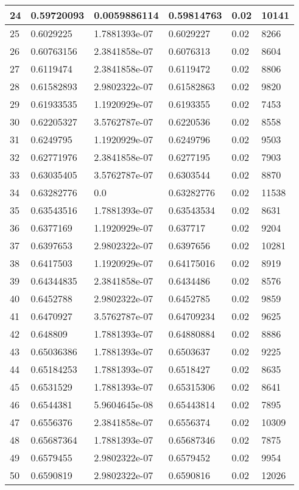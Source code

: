 \begin{longtable}{|l|l|l|l|l|l|}
24 & 0.59720093 & 0.0059886114 & 0.59814763 & 0.02 & 10141 \\ \hline 
25 & 0.6029225 & 1.7881393e-07 & 0.6029227 & 0.02 & 8266 \\ \hline 
26 & 0.60763156 & 2.3841858e-07 & 0.6076313 & 0.02 & 8604 \\ \hline 
27 & 0.6119474 & 2.3841858e-07 & 0.6119472 & 0.02 & 8806 \\ \hline 
28 & 0.61582893 & 2.9802322e-07 & 0.61582863 & 0.02 & 9820 \\ \hline 
29 & 0.61933535 & 1.1920929e-07 & 0.6193355 & 0.02 & 7453 \\ \hline 
30 & 0.62205327 & 3.5762787e-07 & 0.6220536 & 0.02 & 8558 \\ \hline 
31 & 0.6249795 & 1.1920929e-07 & 0.6249796 & 0.02 & 9503 \\ \hline 
32 & 0.62771976 & 2.3841858e-07 & 0.6277195 & 0.02 & 7903 \\ \hline 
33 & 0.63035405 & 3.5762787e-07 & 0.6303544 & 0.02 & 8870 \\ \hline 
34 & 0.63282776 & 0.0 & 0.63282776 & 0.02 & 11538 \\ \hline 
35 & 0.63543516 & 1.7881393e-07 & 0.63543534 & 0.02 & 8631 \\ \hline 
36 & 0.6377169 & 1.1920929e-07 & 0.637717 & 0.02 & 9204 \\ \hline 
37 & 0.6397653 & 2.9802322e-07 & 0.6397656 & 0.02 & 10281 \\ \hline 
38 & 0.6417503 & 1.1920929e-07 & 0.64175016 & 0.02 & 8919 \\ \hline 
39 & 0.64344835 & 2.3841858e-07 & 0.6434486 & 0.02 & 8576 \\ \hline 
40 & 0.6452788 & 2.9802322e-07 & 0.6452785 & 0.02 & 9859 \\ \hline 
41 & 0.6470927 & 3.5762787e-07 & 0.64709234 & 0.02 & 9625 \\ \hline 
42 & 0.648809 & 1.7881393e-07 & 0.64880884 & 0.02 & 8886 \\ \hline 
43 & 0.65036386 & 1.7881393e-07 & 0.6503637 & 0.02 & 9225 \\ \hline 
44 & 0.65184253 & 1.7881393e-07 & 0.6518427 & 0.02 & 8635 \\ \hline 
45 & 0.6531529 & 1.7881393e-07 & 0.65315306 & 0.02 & 8641 \\ \hline 
46 & 0.6544381 & 5.9604645e-08 & 0.65443814 & 0.02 & 7895 \\ \hline 
47 & 0.6556376 & 2.3841858e-07 & 0.6556374 & 0.02 & 10309 \\ \hline 
48 & 0.65687364 & 1.7881393e-07 & 0.65687346 & 0.02 & 7875 \\ \hline 
49 & 0.6579455 & 2.9802322e-07 & 0.6579452 & 0.02 & 9954 \\ \hline 
50 & 0.6590819 & 2.9802322e-07 & 0.6590816 & 0.02 & 12026 \\ \hline 
\end{longtable}